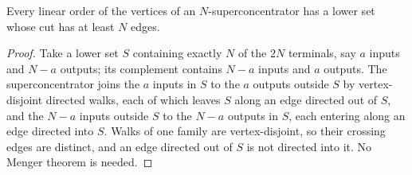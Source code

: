 \begin{lemma}
  \label{lem:lowerbounds-algebraic-superconcentrator-cut}
  \leanok
  Every linear order of the vertices of an $N$-superconcentrator has a lower set whose cut has
  at least $N$ edges.
\end{lemma}
\begin{proof}
  \leanok
  Take a lower set $S$ containing exactly $N$ of the $2N$ terminals, say $a$ inputs and $N-a$
  outputs; its complement contains $N-a$ inputs and $a$ outputs. The superconcentrator joins
  the $a$ inputs in $S$ to the $a$ outputs outside $S$ by vertex-disjoint directed walks, each
  of which leaves $S$ along an edge directed out of $S$, and the $N-a$ inputs outside $S$ to
  the $N-a$ outputs in $S$, each entering along an edge directed into $S$. Walks of one family
  are vertex-disjoint, so their crossing edges are distinct, and an edge directed out of $S$
  is not directed into it. No Menger theorem is needed.
\end{proof}

